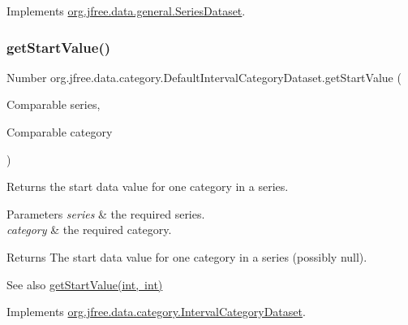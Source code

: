 Implements \mbox{\hyperlink{interfaceorg_1_1jfree_1_1data_1_1general_1_1_series_dataset_a60488892b2314a05a012999e26a74178}{org.\+jfree.\+data.\+general.\+Series\+Dataset}}.

\mbox{\label{classorg_1_1jfree_1_1data_1_1category_1_1_default_interval_category_dataset_a3176b53014d159af5ca98190d4ce27ee}} 
\subsubsection{\texorpdfstring{get\+Start\+Value()}{getStartValue()}\hspace{0.1cm}{\footnotesize\ttfamily [1/2]}}
{\footnotesize\ttfamily Number org.\+jfree.\+data.\+category.\+Default\+Interval\+Category\+Dataset.\+get\+Start\+Value (\begin{DoxyParamCaption}\item[{Comparable}]{series,  }\item[{Comparable}]{category }\end{DoxyParamCaption})}

Returns the start data value for one category in a series.


\begin{DoxyParams}{Parameters}
{\em series} & the required series. \\
\hline
{\em category} & the required category.\\
\hline
\end{DoxyParams}
\begin{DoxyReturn}{Returns}
The start data value for one category in a series (possibly {\ttfamily null}).
\end{DoxyReturn}
\begin{DoxySeeAlso}{See also}
\mbox{\hyperlink{classorg_1_1jfree_1_1data_1_1category_1_1_default_interval_category_dataset_a784e915bf76954a434bf44f587fcb29b}{get\+Start\+Value(int, int)}} 
\end{DoxySeeAlso}


Implements \mbox{\hyperlink{interfaceorg_1_1jfree_1_1data_1_1category_1_1_interval_category_dataset_aec932dc7f50bf72be26002494a266e2e}{org.\+jfree.\+data.\+category.\+Interval\+Category\+Dataset}}.

